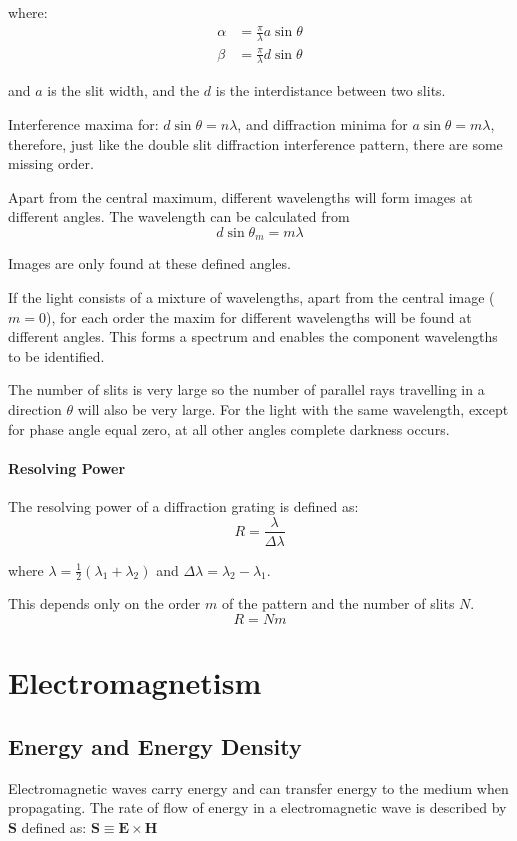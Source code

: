 \documentclass[openany]{book}
\begin{document}
where:
\begin{align*}
\alpha &=\frac{\pi }{\lambda }a\sin \theta\\
\beta &=\frac{\pi }{\lambda }d\sin \theta
\end{align*}

and $a$ is the slit width, and the $d$ is the interdistance between two slits.

Interference maxima for: $d\sin \theta=n\lambda $, and diffraction minima for $a\sin \theta =m\lambda $, therefore, just like the double slit diffraction interference pattern, there are some missing order.

Apart from the central maximum, different wavelengths will form images at different angles. The wavelength can be calculated from
\[d\sin \theta _m=m\lambda\]

Images are only found at these defined angles.

If the light consists of a mixture of wavelengths, apart from the central image ($m = 0$), for each order the maxim for different wavelengths will be found at different angles. This forms a spectrum and enables the component wavelengths to be identified.

The number of slits is very large so the number of parallel rays travelling in a direction $\theta $ will also be very large. For the light with the same wavelength, except for phase angle equal zero, at all other angles complete darkness occurs.

\subsubsection{Resolving Power}
The resolving power of a diffraction grating is defined as:
\[R=\frac{\lambda }{\Delta \lambda}\]

where $\lambda =\frac{1}{2}(\lambda _1+\lambda _2)$ and $\Delta \lambda =\lambda _2-\lambda _1$.

This depends only on the order $m$ of the pattern and the number of slits $N$.
\[R=Nm\]
\appendix
\chapter{Electromagnetism}
\section{Energy and Energy Density}
Electromagnetic waves carry energy and can transfer energy to the medium when propagating. The rate of flow of energy in a electromagnetic wave is described by $\mathbf{S}$ defined as: $\mathbf{S}\equiv \mathbf{E}\times \mathbf{H}$
\end{document}
